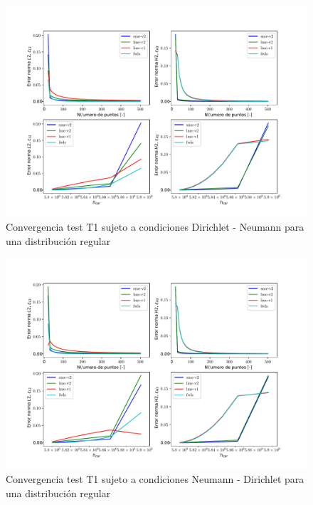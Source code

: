 \begin{figure}
    \centering
    \includegraphics[width=1\textwidth]{./Imagenes/06/comparacion_shp_regular/T2_regular_type-2_caso-2_direct_dgesv-lapack-blas_sme-v2_lme-v2_lme-v1_fwls.pdf}
    \caption{Convergencia test T1 sujeto a condiciones Dirichlet - Neumann para una distribución regular} \label{fig:T2_caso-2_conv}
\end{figure}
\begin{figure}
    \centering
    \includegraphics[width=1\textwidth]{./Imagenes/06/comparacion_shp_regular/T2_regular_type-2_caso-3_direct_dgesv-lapack-blas_sme-v2_lme-v2_lme-v1_fwls.pdf}
    \caption{Convergencia test T1 sujeto a condiciones Neumann - Dirichlet para una distribución regular} \label{fig:T2_caso-3_conv}
\end{figure}
